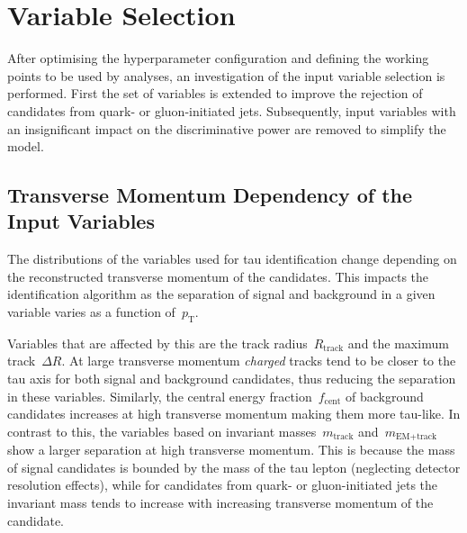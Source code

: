 \section{Variable Selection}
\label{sec:bdt_variable_selection}

After optimising the hyperparameter configuration and defining the working
points to be used by analyses, an investigation of the input variable selection
is performed. First the set of variables is extended to improve the rejection of
\tauhadvis candidates from quark- or gluon-initiated jets. Subsequently, input
variables with an insignificant impact on the discriminative power are removed
to simplify the model.

\subsection{Transverse Momentum Dependency of the Input Variables}
\label{sec:bdt_incl_pt}


The distributions of the variables used for tau identification change depending
on the reconstructed transverse momentum of the \tauhadvis candidates. This
impacts the identification algorithm as the separation of signal and background
in a given variable varies as a function of~$p_\text{T}$.

Variables that are affected by this are the track radius~$R_\text{track}$ and
the maximum track~$\Delta R$. At large transverse momentum \emph{charged} tracks
tend to be closer to the tau axis for both signal and background candidates,
thus reducing the separation in these variables. Similarly, the central energy
fraction~$f_\text{cent}$ of background candidates increases at high transverse
momentum making them more tau-like. In contrast to this, the variables based on
invariant masses~$m_\text{track}$ and~$m_\text{EM+track}$ show a larger
separation at high transverse momentum. This is because the mass of signal
candidates is bounded by the mass of the tau lepton (neglecting detector
resolution effects), while for candidates from quark- or gluon-initiated jets
the invariant mass tends to increase with increasing transverse momentum of the
\tauhadvis candidate. 

